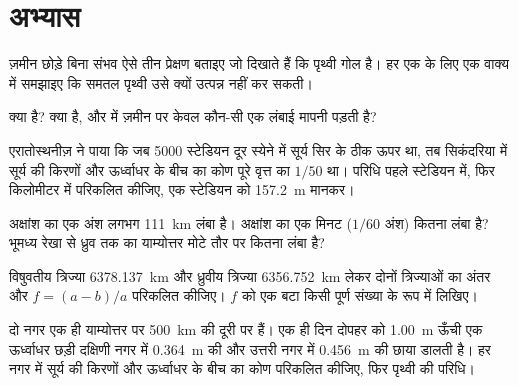 \section{अभ्यास}

\begin{exercise}[$\star$]\label{exo:g10:measuring-the-earth:1}
ज़मीन छोड़े बिना संभव ऐसे तीन प्रेक्षण बताइए जो दिखाते हैं कि पृथ्वी गोल है। हर एक के
लिए एक वाक्य में समझाइए कि समतल पृथ्वी उसे क्यों उत्पन्न नहीं कर
सकती।
\end{exercise}

\begin{exercise}[$\star$]\label{exo:g10:measuring-the-earth:2}
 क्या है?  क्या है, और  में ज़मीन पर केवल कौन-सी एक लंबाई
मापनी पड़ती है?
\end{exercise}

\begin{exercise}[$\star$]\label{exo:g10:measuring-the-earth:3}
एरातोस्थनीज़ ने पाया कि जब 5000 स्टेडियन दूर स्येने में सूर्य सिर के ठीक ऊपर था, तब
सिकंदरिया में सूर्य की किरणों और ऊर्ध्वाधर के बीच का कोण पूरे वृत्त का $1/50$ था।
परिधि पहले स्टेडियन में, फिर किलोमीटर में परिकलित कीजिए,
एक स्टेडियन को \qty{157.2}{m} मानकर।
\end{exercise}

\begin{exercise}[$\star$]\label{exo:g10:measuring-the-earth:4}
अक्षांश का एक अंश लगभग \qty{111}{km} लंबा है। अक्षांश का एक मिनट
($1/60$ अंश) कितना लंबा है? भूमध्य रेखा से ध्रुव तक का याम्योत्तर मोटे तौर पर कितना
लंबा है?
\end{exercise}

\begin{exercise}[$\star$]\label{exo:g10:measuring-the-earth:5}
विषुवतीय त्रिज्या \qty{6378.137}{km} और ध्रुवीय त्रिज्या
\qty{6356.752}{km} लेकर दोनों त्रिज्याओं का अंतर और
 $f = (a-b)/a$ परिकलित कीजिए। $f$ को एक बटा किसी पूर्ण संख्या के रूप में लिखिए।
\end{exercise}

\begin{exercise}[$\star\star$]\label{exo:g10:measuring-the-earth:6}
दो नगर एक ही याम्योत्तर पर \qty{500}{km} की दूरी पर हैं। एक ही दिन दोपहर को
\qty{1.00}{m} ऊँची एक ऊर्ध्वाधर छड़ी दक्षिणी नगर में \qty{0.364}{m} की और
उत्तरी नगर में \qty{0.456}{m} की छाया डालती है। हर नगर में सूर्य की किरणों और
ऊर्ध्वाधर के बीच का कोण परिकलित कीजिए, फिर पृथ्वी की
परिधि।
\end{exercise}

